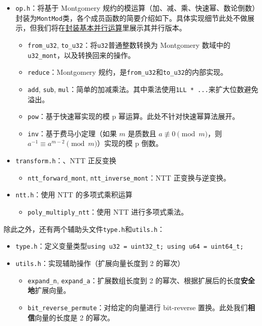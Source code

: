 \documentclass[a4paper]{article}
\begin{document}
\begin{itemize}
    \item \texttt{op.h}：将基于 Montgomery 规约的模运算（加、减、乘、快速幂、数论倒数）封装为\texttt{MontMod}类，各个成员函数的简要介绍如下。具体实现细节此处不做展示，但我们将在\hyperref[sec:parallel_ops]{封装基本并行运算}里展示其并行版本。
    \begin{itemize}
        \item \texttt{from\_u32}, \texttt{to\_u32}：将\texttt{u32}普通整数转换为 Montgomery 数域中的\texttt{u32\_mont}，以及转换回来的操作。
        \item \texttt{reduce}：Montgomery 规约，是\texttt{from\_u32}和\texttt{to\_u32}的内部实现。
        \item \texttt{add}, \texttt{sub}, \texttt{mul}：简单的加减乘法。其中乘法使用\texttt{1LL * ...}来扩大位数避免溢出。
        \item \texttt{pow}：基于快速幂实现的模 p 幂运算。此处不针对快速幂算法展开。
        \item \texttt{inv}：基于费马小定理（如果 \( m \) 是质数且 \( a \not\equiv 0 \pmod{m} \)，则 \( a^{-1} \equiv a^{m-2} \pmod{m} \)）实现的模 p 倒数。
    \end{itemize}
    \item \texttt{transform.h}：、NTT 正反变换
    \begin{itemize}
        \item \texttt{ntt\_forward\_mont}, \texttt{ntt\_inverse\_mont}：NTT 正变换与逆变换。
    \end{itemize}
    \item \texttt{ntt.h}：使用 NTT 的多项式乘积运算
    \begin{itemize}
        \item \texttt{poly\_multiply\_ntt}：使用 NTT 进行多项式乘法。
    \end{itemize}
\end{itemize}

除此之外，还有两个辅助头文件\texttt{type.h}和\texttt{utils.h}：

\begin{itemize}
    \item \texttt{type.h}：定义变量类型\texttt{using u32 = uint32\_t; using u64 = uint64\_t;}
    \item \texttt{utils.h}：实现辅助操作（扩展向量长度到 2 的幂次）
    \begin{itemize}
        \item \texttt{expand\_n}, \texttt{expand\_a}：扩展数组长度到 2 的幂次、根据扩展后的长度\textbf{安全地}扩展向量。
        \item \texttt{bit\_reverse\_permute}：对给定的向量进行 bit-reverse 置换。此处我们\textbf{相信}向量的长度是 2 的幂次。
    \end{itemize}
\end{itemize}
\end{document}
